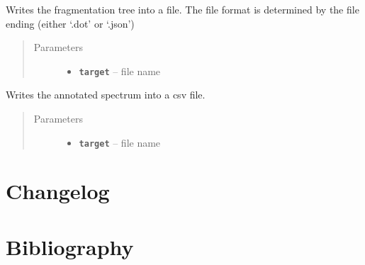 \documentclass[letterpaper,10pt,openany,oneside]{sphinxmanual}
\begin{document}
\begin{fulllineitems}
\label{library:de.unijena.bioinf.sirius.writeTreeToFile(File)}
Writes the fragmentation tree into a file. The file format is determined by the file ending (either `.dot' or `.json')
\begin{quote}\begin{description}
\item[{Parameters}] \leavevmode\begin{itemize}
\item {} 
\textbf{\texttt{target}} -- file name

\end{itemize}

\end{description}\end{quote}

\end{fulllineitems}


\begin{fulllineitems}
\label{library:de.unijena.bioinf.sirius.writeAnnotatedSpectrumToFile(File)}
Writes the annotated spectrum into a csv file.
\begin{quote}\begin{description}
\item[{Parameters}] \leavevmode\begin{itemize}
\item {} 
\textbf{\texttt{target}} -- file name

\end{itemize}

\end{description}\end{quote}

\end{fulllineitems}


\newpage
\chapter{Changelog}



\chapter{Bibliography}
\printbibliography[heading=none]




\renewcommand{\indexname}{Index}
\printindex
\end{document}
